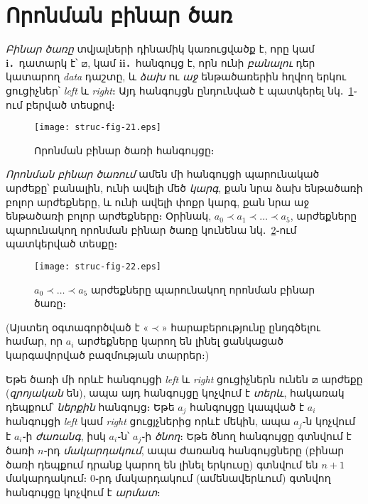 
\section{Որոնման բինար ծառ}

\emph{Բինար ծառը} տվյալների դինամիկ կառուցվածք է, որը 
կամ \textbf{i․}~դատարկ է՝ \(\boxslash\), կամ 
\textbf{ii․}~հանգույց է, որն ունի \emph{բանալու} դեր 
կատարող \emph{data} դաշտը, և \emph{ձախ} ու \emph{աջ} 
ենթածառերին հղվող երկու ցուցիչներ՝ \emph{left} և 
\emph{right}։ Այդ հանգույցն ընդունված է պատկերել 
նկ․~\ref{fig:bst-1}֊ում բերված տեսքով։

\begin{figure}[h]
\centering
\texttt{[image: struc-fig-21.eps]}
\caption{Որոնման բինար ծառի հանգույցը։}
\label{fig:bst-1}
\end{figure}

\emph{Որոնման բինար ծառում} ամեն մի հանգույցի պարունակած 
արժեքը՝ բանալին, ունի ավելի մեծ \emph{կարգ}, քան նրա ձախ 
ենթածառի բոլոր արժեքները, և ունի ավելի փոքր կարգ, քան նրա 
աջ ենթածառի բոլոր արժեքները։ Օրինակ, 
\(a_0\prec a_1\prec\ldots\prec a_5\),
արժեքները պարունակող որոնման բինար ծառը 
կունենա նկ․~\ref{fig:bst-2}֊ում պատկերված տեսքը։
\begin{figure}[h]
\centering
\texttt{[image: struc-fig-22.eps]}
\caption{\(a_0\prec\ldots\prec a_5\) արժեքները պարունակող 
որոնման բինար ծառը։}
\label{fig:bst-2}
\end{figure}
(Այստեղ օգտագործված է «\(\prec\)» հարաբերությունը ընդգծելու 
համար, որ \(a_i\) արժեքները կարող են լինել ցանկացած 
կարգավորված բազմության տարրեր։)

Եթե ծառի մի որևէ հանգույցի \emph{left} և \emph{right} 
ցուցիչներն ունեն \(\boxslash\) արժեքը (\emph{զրոյական} 
են), ապա այդ հանգույցը կոչվում է \emph{տերև}, հակառակ 
դեպքում՝ \emph{ներքին} հանգույց։ Եթե \(a_j\) հանգույցը 
կապված է \(a_i\) հանգույցի \emph{left} կամ \emph{right} 
ցուցյչներից որևէ մեկին, ապա \(a_j\)֊ն կոչվում է \(a_i\)֊ի 
\emph{ժառանգ}, իսկ \(a_i\)֊ն՝ \(a_j\)֊ի \emph{ծնող}։ Եթե 
ծնող հանգույցը գտնվում է ծառի \(n\)֊րդ \emph{մակարդակում}, 
ապա ժառանգ հանգույցները (բինար ծառի դեպքում դրանք կարող 
են լինել երկուսը) գտնվում են \(n+1\) մակարդակում։ \(0\)֊րդ
մակարդակում (ամենավերևում) գտնվող հանգույցը կոչվում է
\emph{արմատ}։  

%
%
